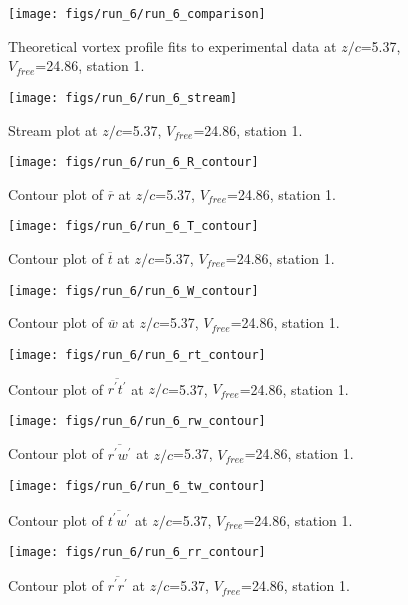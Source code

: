 \begin{figure}[H]
\centering
\texttt{[image: figs/run\_6/run\_6\_comparison]}
\caption{Theoretical vortex profile fits to experimental data at $z/c$=5.37, $V_{free}$=24.86, station 1.}
\end{figure}


\begin{figure}[H]
\centering
\texttt{[image: figs/run\_6/run\_6\_stream]}
\caption{Stream plot at $z/c$=5.37, $V_{free}$=24.86, station 1.}
\end{figure}


\begin{figure}[H]
\centering
\texttt{[image: figs/run\_6/run\_6\_R\_contour]}
\caption{Contour plot of $\overline{r}$ at $z/c$=5.37, $V_{free}$=24.86, station 1.}
\end{figure}


\begin{figure}[H]
\centering
\texttt{[image: figs/run\_6/run\_6\_T\_contour]}
\caption{Contour plot of $\overline{t}$ at $z/c$=5.37, $V_{free}$=24.86, station 1.}
\end{figure}


\begin{figure}[H]
\centering
\texttt{[image: figs/run\_6/run\_6\_W\_contour]}
\caption{Contour plot of $\overline{w}$ at $z/c$=5.37, $V_{free}$=24.86, station 1.}
\end{figure}


\begin{figure}[H]
\centering
\texttt{[image: figs/run\_6/run\_6\_rt\_contour]}
\caption{Contour plot of $\overline{r^\prime t^\prime}$ at $z/c$=5.37, $V_{free}$=24.86, station 1.}
\end{figure}


\begin{figure}[H]
\centering
\texttt{[image: figs/run\_6/run\_6\_rw\_contour]}
\caption{Contour plot of $\overline{r^\prime w^\prime}$ at $z/c$=5.37, $V_{free}$=24.86, station 1.}
\end{figure}


\begin{figure}[H]
\centering
\texttt{[image: figs/run\_6/run\_6\_tw\_contour]}
\caption{Contour plot of $\overline{t^\prime w^\prime}$ at $z/c$=5.37, $V_{free}$=24.86, station 1.}
\end{figure}


\begin{figure}[H]
\centering
\texttt{[image: figs/run\_6/run\_6\_rr\_contour]}
\caption{Contour plot of $\overline{r^\prime r^\prime}$ at $z/c$=5.37, $V_{free}$=24.86, station 1.}
\end{figure}


